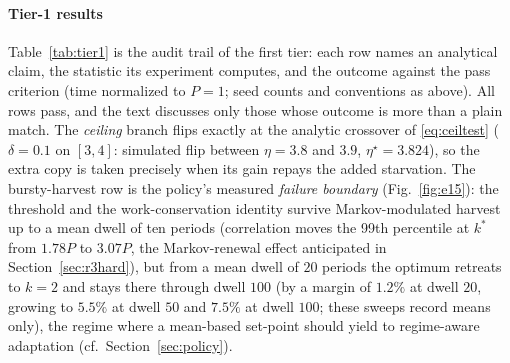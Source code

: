 \documentclass[twocolumn,3p,times,procedia]{elsarticle}
\theoremstyle{plain}
\theoremstyle{remark}
\newcommand{\kstar}{k^{\ast}}
\begin{document}
\paragraph*{Tier-1 results}
Table~\ref{tab:tier1} is the audit trail of the first tier: each row
names an analytical claim, the statistic its experiment computes, and
the outcome against the pass criterion (time normalized to $P{=}1$;
seed counts and conventions as above). All rows pass, and the text
discusses only those whose outcome is more than a plain match. The
\emph{ceiling} branch flips exactly at the analytic crossover of
\eqref{eq:ceiltest} ($\delta{=}0.1$ on $[3,4]$: simulated flip between
$\eta{=}3.8$ and $3.9$, $\eta^\star{=}3.824$), so the extra copy is
taken precisely when its gain repays the added starvation. The
bursty-harvest row is the policy's measured \emph{failure boundary}
(Fig.~\ref{fig:e15}): the threshold and the work-conservation identity
survive Markov-modulated harvest up to a mean dwell of ten periods
(correlation moves the 99th percentile at $\kstar$ from $1.78P$ to
$3.07P$, the Markov-renewal effect anticipated in
Section~\ref{sec:r3hard}), but from
a mean dwell of $20$ periods the optimum retreats to $k{=}2$ and stays
there through dwell $100$ (by a margin of $1.2\%$ at dwell $20$, growing
to $5.5\%$ at dwell $50$ and $7.5\%$ at dwell $100$; these sweeps record
means only), the regime where a mean-based set-point
should yield to regime-aware adaptation (cf.\
Section~\ref{sec:policy}).
\end{document}
